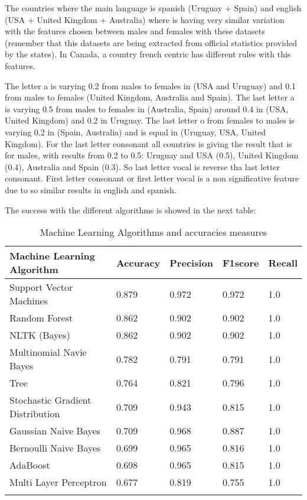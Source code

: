 \documentclass[a4paper]{article}
\begin{document}
The countries where the main language is spanish (Uruguay + Spain) and
english (USA + United Kingdom + Australia) where is having very
similar variation with the features chosen between males and females
with these datasets (remember that this datasets are being extracted
from official statistics provided by the states). In Canada, a country
french centric has different rules with this features.

The letter a is varying 0.2 from males to females in (USA and Uruguay)
and 0.1 from males to females (United Kingdom, Australia and
Spain). The last letter a is varying 0.5 from males to females in
(Australia, Spain) around 0.4 in (USA, United Kingdom) and 0.2 in
Uruguay. The last letter o from females to males is varying 0.2 in
(Spain, Australia) and is equal in (Uruguay, USA, United Kingdom). For
the last letter consonant all countries is giving the result that is
for males, with results from 0.2 to 0.5: Uruguay and USA (0.5), United
Kingdom (0.4), Australia and Spain (0.3). So last letter vocal is
reverse tha last letter consonant. First letter consonant or first
letter vocal is a non significative feature due to so similar results
in english and spanish.

The success with the different algorithms is showed in the next table:

\begin{longtable}[]{@{}lllll@{}}
  \toprule
  Machine Learning Algorithm & Accuracy & Precision & F1score & Recall \tabularnewline
  \midrule
  \endhead

 Support Vector Machines             &    0.879 &     0.972 &   0.972 &    1.0 & \tabularnewline
 Random Forest                       &    0.862 &     0.902 &   0.902 &    1.0 & \tabularnewline
 NLTK (Bayes)                        &    0.862 &     0.902 &   0.902 &    1.0 & \tabularnewline
 Multinomial Navie Bayes             &    0.782 &     0.791 &   0.791 &    1.0 & \tabularnewline
 Tree                                &    0.764 &     0.821 &   0.796 &    1.0 & \tabularnewline
 Stochastic Gradient Distribution    &    0.709 &     0.943 &   0.815 &    1.0 & \tabularnewline
 Gaussian Naive Bayes                &    0.709 &     0.968 &   0.887 &    1.0 & \tabularnewline
 Bernoulli Naive Bayes               &    0.699 &     0.965 &   0.816 &    1.0 & \tabularnewline
 AdaBoost                            &    0.698 &     0.965 &   0.815 &    1.0 & \tabularnewline
 Multi Layer Perceptron              &    0.677 &     0.819 &   0.755 &    1.0 & \tabularnewline

\bottomrule
\caption{Machine Learning Algorithms and accuracies measures}
\label{table:MLAccuracies}
\end{longtable}
\end{document}
